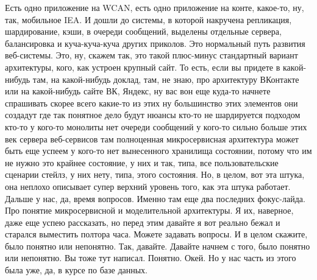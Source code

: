 \documentclass[12pt]{article} %
\begin{document}
Есть одно приложение на WCAN, есть одно приложение на конте, какое-то, ну, так, мобильное IEA.  И дошли до системы, в которой накручена репликация, шардирование, кэши, в очереди сообщений, выделены отдельные сервера, балансировка и куча-куча-куча других приколов.  Это нормальный путь развития веб-системы.  Это, ну, скажем так, это такой плюс-минус стандартный вариант архитектуры, кого, как устроен крупный сайт.  То есть, если вы придете в какой-нибудь там, на какой-нибудь доклад, там, не знаю, про архитектуру ВКонтакте или на какой-нибудь сайте ВК, Яндекс, ну вас вон еще куда-то начнете спрашивать скорее всего какие-то из этих ну большинство этих элементов они создадут где так понятное дело будут нюансы кто-то не шардируется подходом кто-то у кого-то монолиты нет очереди сообщений у кого-то сильно больше этих век сервера веб-сервисов там полноценная микросервисная архитектура может быть еще успеем у кого-то нет вынесенного хранилища состоянии, потому что им не нужно это крайнее состояние, у них и так, типа, все пользовательские сценарии стейлз, у них нету, типа, этого состояния. Но, в целом, вот эта штука, она неплохо описывает супер верхний уровень того, как эта штука работает.  Дальше у нас, да, время вопросов. Именно там еще два последних фокус-лайда. Про понятие микросервисной и моделительной архитектуры.  Я их, наверное, даже еще успею рассказать, но перед этим давайте я вот реально бежал и старался выместить полтора часа.  Можете задавать вопросы.  И в целом скажите, было понятно или непонятно.  Так, давайте.  Давайте начнем с того, было понятно или непонятно.  Вы тоже тут написал.  Понятно.  Окей.  Но у нас часть из этого была уже, да, в курсе по базе данных.
\end{document}
